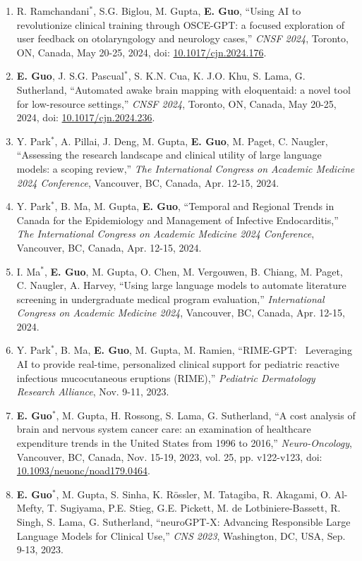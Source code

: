 \documentclass{article}
\begin{document}
\begin{enumerate}
    \item R. Ramchandani$^*$, S.G. Biglou, M. Gupta, \textbf{E. Guo}, ``Using AI to revolutionize clinical training through OSCE-GPT: a focused exploration of user feedback on otolaryngology and neurology cases,'' \textit{CNSF 2024}, Toronto, ON, Canada, May 20-25, 2024, doi: \href{https://doi.org/10.1017/cjn.2024.176}{10.1017/cjn.2024.176}.
    \item \textbf{E. Guo}, J. S.G. Pascual$^*$, S. K.N. Cua, K. J.O. Khu, S. Lama, G. Sutherland, ``Automated awake brain mapping with eloquentaid: a novel tool for low-resource settings,'' \textit{CNSF 2024}, Toronto, ON, Canada, May 20-25, 2024, doi: \href{https://doi.org/10.1017/cjn.2024.236}{10.1017/cjn.2024.236}.
    \item Y. Park$^*$, A. Pillai, J. Deng, M. Gupta, \textbf{E. Guo}, M. Paget, C. Naugler, ``Assessing the research landscape and clinical utility of large language models: a scoping review,'' \textit{The International Congress on Academic Medicine 2024 Conference}, Vancouver, BC, Canada, Apr. 12-15, 2024.
    \item Y. Park$^*$, B. Ma, M. Gupta, \textbf{E. Guo}, ``Temporal and Regional Trends in Canada for the Epidemiology and Management of Infective Endocarditis,'' \textit{The International Congress on Academic Medicine 2024 Conference}, Vancouver, BC, Canada, Apr. 12-15, 2024.
    \item I. Ma$^*$, \textbf{E. Guo}, M. Gupta, O. Chen, M. Vergouwen, B. Chiang, M. Paget, C. Naugler, A. Harvey, ``Using large language models to automate literature screening in undergraduate medical program evaluation,'' \textit{International Congress on Academic Medicine 2024}, Vancouver, BC, Canada, Apr. 12-15, 2024.
    \item Y. Park$^*$, B. Ma, \textbf{E. Guo}, M. Gupta, M. Ramien, ``RIME-GPT:  Leveraging AI to provide real-time, personalized clinical support for pediatric reactive infectious mucocutaneous eruptions (RIME),'' \textit{Pediatric Dermatology Research Alliance}, Nov. 9-11, 2023.
    \item \textbf{E. Guo}$^*$, M. Gupta, H. Rossong, S. Lama, G. Sutherland, ``A cost analysis of brain and nervous system cancer care: an examination of healthcare expenditure trends in the United States from 1996 to 2016,'' \textit{Neuro-Oncology}, Vancouver, BC, Canada, Nov. 15-19, 2023, vol. 25, pp. v122-v123, doi: \href{https://doi.org/10.1093/neuonc/noad179.0464}{10.1093/neuonc/noad179.0464}.
    \item \textbf{E. Guo}$^*$, M. Gupta, S. Sinha, K. R\"ossler, M. Tatagiba, R. Akagami, O. Al-Mefty, T. Sugiyama, P.E. Stieg, G.E. Pickett, M. de Lotbiniere-Bassett, R. Singh, S. Lama, G. Sutherland, ``neuroGPT-X: Advancing Responsible Large Language Models for Clinical Use,'' \textit{CNS 2023}, Washington, DC, USA, Sep. 9-13, 2023.

\end{enumerate}
\end{document}
